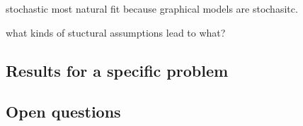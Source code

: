 \documentclass[11pt,a4paper]{article}
\begin{document}
stochastic most natural fit because graphical models are stochasitc. 

what kinds of stuctural assumptions lead to what?

\subsection{Results for a specific problem}

\subsection{Open questions}


\end{document}
